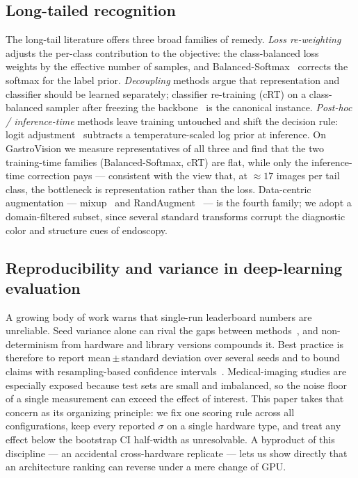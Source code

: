 \documentclass[11pt,a4paper]{article}
\begin{document}
\subsection{Long-tailed recognition}
The long-tail literature offers three broad families of remedy. \emph{Loss
re-weighting} adjusts the per-class contribution to the objective: the
class-balanced loss~\cite{cbloss} weights by the effective number of samples, and
Balanced-Softmax~\cite{balms} corrects the softmax for the label prior.
\emph{Decoupling} methods argue that representation and classifier should be
learned separately; classifier re-training (cRT) on a class-balanced sampler after
freezing the backbone~\cite{decoupling} is the canonical instance.
\emph{Post-hoc / inference-time} methods leave training untouched and shift the
decision rule: logit adjustment~\cite{logitadj} subtracts a temperature-scaled log
prior at inference. On GastroVision we measure representatives of all three and
find that the two training-time families (Balanced-Softmax, cRT) are flat, while
only the inference-time correction pays --- consistent with the view that, at
$\approx17$ images per tail class, the bottleneck is representation rather than the
loss. Data-centric augmentation --- mixup~\cite{mixup} and
RandAugment~\cite{randaugment} --- is the fourth family; we adopt a domain-filtered
subset, since several standard transforms corrupt the diagnostic color and
structure cues of endoscopy.

\subsection{Reproducibility and variance in deep-learning evaluation}
A growing body of work warns that single-run leaderboard numbers are unreliable.
Seed variance alone can rival the gaps between methods~\cite{seedvariance}, and
non-determinism from hardware and library versions compounds it. Best practice is
therefore to report mean\,$\pm$\,standard deviation over several seeds and to bound
claims with resampling-based confidence intervals~\cite{bootstrap}. Medical-imaging
studies are especially exposed because test sets are small and imbalanced, so the
noise floor of a single measurement can exceed the effect of interest. This paper
takes that concern as its organizing principle: we fix one scoring rule across all
configurations, keep every reported $\sigma$ on a single hardware type, and treat
any effect below the bootstrap CI half-width as unresolvable. A byproduct of this
discipline --- an accidental cross-hardware replicate --- lets us show directly
that an architecture ranking can reverse under a mere change of GPU.
\end{document}
